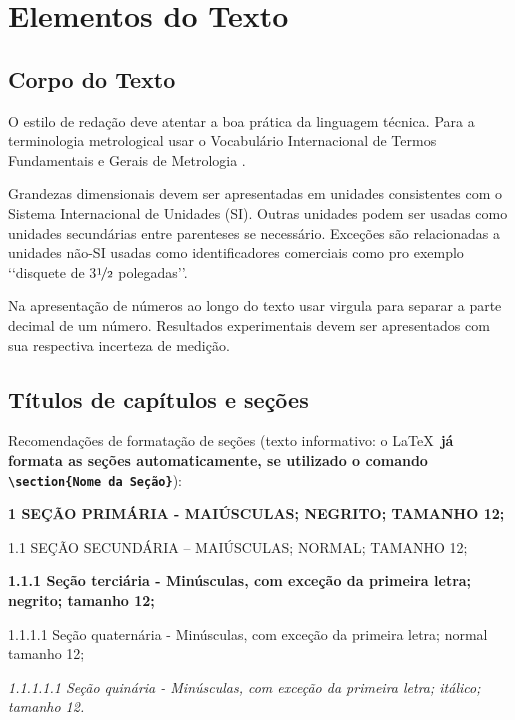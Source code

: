 \chapter[Elementos do Texto]{Elementos do Texto}

\section{Corpo do Texto}

O estilo de redação deve atentar a boa prática da linguagem técnica. Para a
terminologia metrological usar o Vocabulário Internacional de Termos
Fundamentais e Gerais de Metrologia \cite{inmetro2003}.

Grandezas dimensionais devem ser apresentadas em unidades consistentes com
o Sistema Internacional de Unidades  (SI). Outras unidades podem ser usadas
como unidades secundárias entre parenteses se necessário. Exceções são
relacionadas a unidades não-SI usadas como identificadores comerciais como
pro exemplo \lq\lq disquete de  3$\nicefrac{1}{2}$ polegadas\rq\rq.

Na apresentação de números ao longo do texto usar virgula para separar a
parte decimal de um número. Resultados experimentais devem ser apresentados
com sua respectiva incerteza de medição.

\section{Títulos de capítulos e seções}

Recomendações de formatação de seções (texto informativo: o \LaTeX\
\textbf{já formata as seções automaticamente, se utilizado o comando
\texttt{\textbackslash section\{Nome da Seção\}}}):

\begin{description}

	\item \textbf{1 SEÇÃO PRIMÁRIA - MAIÚSCULAS; NEGRITO; TAMANHO 12;}

	\item 1.1 SEÇÃO SECUNDÁRIA – MAIÚSCULAS; NORMAL; TAMANHO 12;

	\item \textbf{1.1.1 Seção terciária - Minúsculas, com exceção da
	primeira letra; negrito; tamanho 12;}

	\item 1.1.1.1 Seção quaternária - Minúsculas, com exceção da primeira
	letra; normal tamanho 12;

 	\item \textit{1.1.1.1.1 Seção quinária - Minúsculas, com exceção da
	primeira letra; itálico; tamanho 12.}

\end{description}

